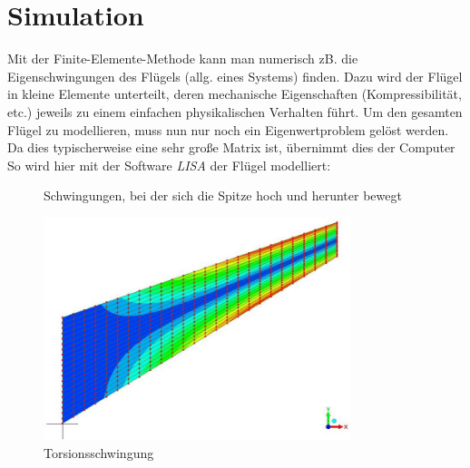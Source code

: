 \documentclass[12pt,a4paper,headinclude,bibtotoc]{scrartcl}
\begin{document}
\section{Simulation}
Mit der Finite-Elemente-Methode kann man numerisch zB. die Eigenschwingungen des Flügels (allg. eines Systems) finden.
Dazu wird der Flügel in kleine Elemente unterteilt, deren mechanische Eigenschaften (Kompressibilität, etc.) jeweils zu einem einfachen physikalischen Verhalten führt.
Um den gesamten Flügel zu modellieren, muss nun nur noch ein Eigenwertproblem gelöst werden.
Da dies typischerweise eine sehr große Matrix ist, übernimmt dies der Computer
So wird hier mit der Software \textit{LISA} der Flügel modelliert:

 \begin{figure}[htb]
   \centering
   \hfill
   \caption{Schwingungen, bei der sich die Spitze hoch und herunter bewegt}
   \label{fig:fspitze}
 \end{figure}

\begin{figure}[!htb]
	\centering
	\includegraphics[width=0.8\textwidth]{schwingung2.jpg}
	\caption{Torsionsschwingung}
	\label{fig:torsion}
\end{figure}
\end{document}

